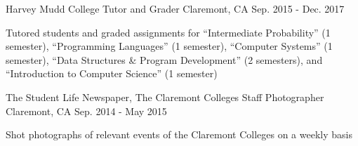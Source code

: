 

\begin{cventries}

  \cventry
    {Harvey Mudd College} %
    {Tutor and Grader} %
    {Claremont, CA} %
    {Sep. 2015 - Dec. 2017} %
    {
      \begin{cvitems} %
        \item {Tutored students and graded assignments for
        ``Intermediate Probability'' (1 semester), ``Programming Languages'' (1 semester),
        ``Computer Systems'' (1 semester),
        ``Data Structures \& Program Development'' (2 semesters),
        and ``Introduction to Computer Science'' (1 semester)}
      \end{cvitems}
    }

  \cventry
    {The Student Life Newspaper, The Claremont Colleges} %
    {Staff Photographer} %
    {Claremont, CA} %
    {Sep. 2014 - May 2015} %
    {
      \begin{cvitems} %
        \item {Shot photographs of relevant events of the Claremont Colleges on
        a weekly basis}
      \end{cvitems}
    }

\end{cventries}
